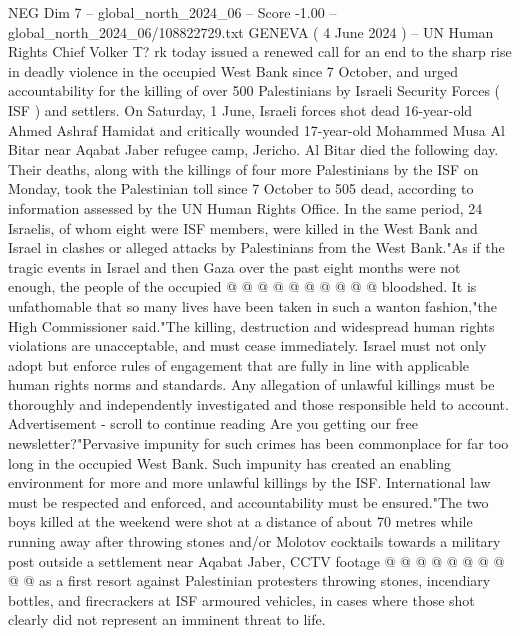 \begin{textsample}{NEG Dim 7 – global\_north\_2024\_06 – Score -1.00 – global\_north\_2024\_06/108822729.txt}  \label{ex:f7_neg_373}
GENEVA ( 4 June 2024 ) -- UN Human Rights Chief Volker T? rk today issued a renewed call for an end to the sharp rise in deadly violence in the occupied West Bank since 7 October, and urged accountability for the killing of over 500 Palestinians by Israeli Security Forces ( ISF ) and settlers.
On Saturday, 1 June, Israeli forces shot dead 16-year-old Ahmed Ashraf Hamidat and critically wounded 17-year-old Mohammed Musa Al Bitar near Aqabat Jaber refugee camp, Jericho.
Al Bitar died the following day.
Their deaths, along with the killings of four more Palestinians by the ISF on Monday, took the Palestinian toll since 7 October to 505 dead, according to information assessed by the UN Human Rights Office.
In the same period, 24 Israelis, of whom eight were ISF members, were killed in the West Bank and Israel in clashes or alleged attacks by Palestinians from the West Bank."As if the tragic events in Israel and then Gaza over the past eight months were not enough, the people of the occupied @ @ @ @ @ @ @ @ @ @ bloodshed.
It is unfathomable that so many lives have been taken in such a wanton fashion,"the High Commissioner said."The killing, destruction and widespread human rights violations are unacceptable, and must cease immediately.
Israel must not only adopt but enforce rules of engagement that are fully in line with applicable human rights norms and standards.
Any allegation of unlawful killings must be thoroughly and independently investigated and those responsible held to account.
Advertisement - scroll to continue reading Are you getting our free newsletter?"Pervasive impunity for such crimes has been commonplace for far too long in the occupied West Bank.
Such impunity has created an enabling environment for more and more unlawful killings by the ISF.
International law must be respected and enforced, and accountability must be ensured."The two boys killed at the weekend were shot at a distance of about 70 metres while running away after throwing stones and/or Molotov cocktails towards a military post outside a settlement near Aqabat Jaber, CCTV footage @ @ @ @ @ @ @ @ @ @ as a first resort against Palestinian protesters throwing stones, incendiary bottles, and firecrackers at ISF armoured vehicles, in cases where those shot clearly did not represent an imminent threat to life.

\end{textsample}
